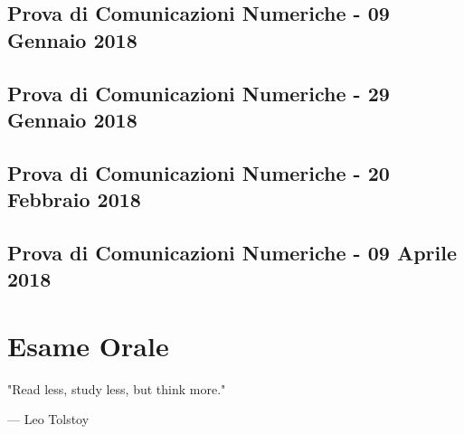 \documentclass[12pt,oneside,openany]{memoir}
\numberwithin{equation}{subsection}
\begin{document}

\section{Prova di Comunicazioni Numeriche - 09 Gennaio 2018}


\section{Prova di Comunicazioni Numeriche - 29 Gennaio 2018}


\section{Prova di Comunicazioni Numeriche - 20 Febbraio 2018}


\section{Prova di Comunicazioni Numeriche - 09 Aprile 2018}


\chapter{Esame Orale}
\epigraph{
	"Read less, study less, but think more."
}{--- \textup{Leo Tolstoy}}
\end{document}
